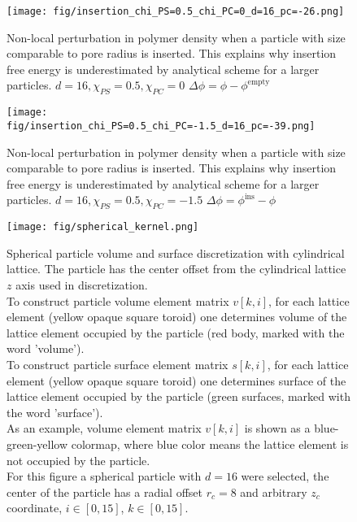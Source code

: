 \documentclass[12pt, a4paper]{article}
\begin{document}
\begin{figure}
    \centering
    \texttt{[image: fig/insertion\_chi\_PS=0.5\_chi\_PC=0\_d=16\_pc=-26.png]}
    \caption{
        Non-local perturbation in polymer density when a particle with size comparable to pore radius is inserted. This explains why insertion free energy is underestimated by analytical scheme for a larger particles.
        $d=16, \chi_{PS} = 0.5, \chi_{PC} = 0$
        $\Delta \phi = \phi - \phi^{\textrm{empty}}$
        }
    \label{fig:particle_insertion_0}
\end{figure}

\begin{figure}
    \centering
    \texttt{[image: fig/insertion\_chi\_PS=0.5\_chi\_PC=-1.5\_d=16\_pc=-39.png]}
    \caption{
        Non-local perturbation in polymer density when a particle with size comparable to pore radius is inserted. This explains why insertion free energy is underestimated by analytical scheme for a larger particles.
        $d=16, \chi_{PS} = 0.5, \chi_{PC} = -1.5$
        $\Delta \phi = \phi^{\textrm{ins}} - \phi$
        }
    \label{fig:particle_insertion_1}
\end{figure}



\begin{figure}
    \centering
    \texttt{[image: fig/spherical\_kernel.png]}
    \caption{
        Spherical particle volume and surface discretization with cylindrical lattice.
        The particle has the center offset from the cylindrical lattice $z$ axis used in discretization.
        \\
        To construct particle volume element matrix $v[k,i]$, for each lattice element (yellow opaque square toroid) one determines volume of the lattice element occupied by the particle (red body, marked with the word 'volume').
        \\
        To construct particle surface element matrix $s[k,i]$, for each lattice element (yellow opaque square toroid) one determines surface of the lattice element occupied by the particle (green surfaces, marked with the word 'surface').
        \\
        As an example, volume element matrix $v[k,i]$ is shown as a blue-green-yellow colormap, 
        where blue color means the lattice element is not occupied by the particle.
        \\
        For this figure a spherical particle with $d=16$ were selected, the center of the particle has a radial offset $r_c=8$ and arbitrary $z_c$ coordinate,
        $i \in [0,15]$, $k \in [0,15]$.
    }
    \label{fig:spherical_kernel}
\end{figure}
\end{document}
